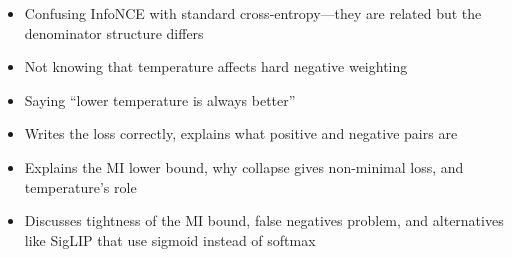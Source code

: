 \begin{interviewq}
\redflags
\begin{itemize}
    \item Confusing InfoNCE with standard cross-entropy---they are related but the denominator structure differs
    \item Not knowing that temperature affects hard negative weighting
    \item Saying ``lower temperature is always better''
\end{itemize}


\goodgreat
\begin{itemize}
    \item {} Writes the loss correctly, explains what positive and negative pairs are
    \item {} Explains the MI lower bound, why collapse gives non-minimal loss, and temperature's role
    \item {} Discusses tightness of the MI bound, false negatives problem, and alternatives like SigLIP that use sigmoid instead of softmax
\end{itemize}

\end{interviewq}

